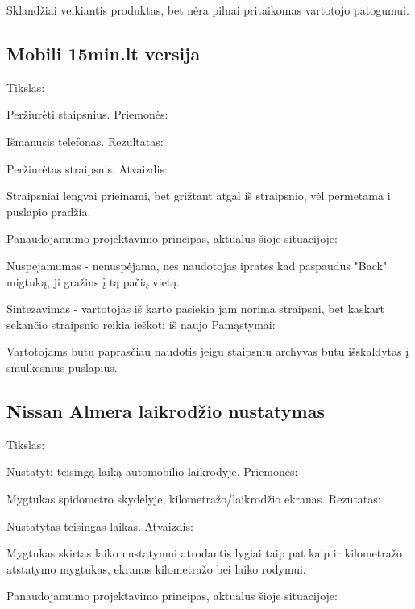﻿\documentclass[a4paper, 12pt]{article}
\newcommand{\placeholder}{\textbf{\textsf{\textcolor{red}{\fbox{PLACEHOLDER}}}}}
\begin{document}
		Sklandžiai veikiantis produktas, bet nėra pilnai pritaikomas vartotojo patogumui.
	\subsection{Mobili 15min.lt versija}	
		Tikslas:
		
		Peržiurėti staipsnius.\newline
		Priemonės:
		
		Išmanusis telefonas.\newline
		Rezultatas:
		
		Peržiurėtas straipsnis.\newline
		Atvaizdis:
		
		Straipsniai lengvai prieinami, bet grižtant atgal iš straipsnio, vėl permetama i puslapio pradžia.\newline
		
		Panaudojamumo projektavimo principas, aktualus šioje situacijoje:
		
		Nuspejamumas - nenuspėjama, nes naudotojas iprates kad paspaudus "Back" migtuką, ji gražins į tą pačią vietą.
		
		Sintezavimas - vartotojas iš karto pasiekia jam norima straipsni, bet kaskart sekančio straipsnio reikia ieškoti iš naujo\newline		
		Pamąstymai:
		
		Vartotojams butu paprasčiau naudotis jeigu staipsniu archyvas butu išskaldytas į smulkesnius puslapius.
		\placeholder

	\subsection{Nissan Almera laikrodžio nustatymas}
		Tikslas:
		
		Nustatyti teisingą laiką automobilio laikrodyje.\newline
		Priemonės:
		
		Mygtukas spidometro skydelyje, kilometražo/laikrodžio ekranas.\newline
		Rezutatas:
		
		Nustatytas teisingas laikas.\newline
		Atvaizdis:
		
		Mygtukas skirtas laiko nustatymui atrodantis lygiai taip pat kaip ir kilometražo atstatymo mygtukas,
		ekranas kilometražo bei laiko rodymui.\newline
		
		Panaudojamumo projektavimo principas, aktualus šioje situacijoje:
		
\end{document}
